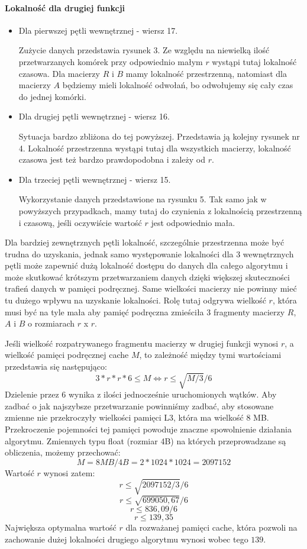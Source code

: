 \documentclass{article}
\begin{document}
\paragraph{Lokalność dla drugiej funkcji}

\begin{itemize}

\item Dla pierwszej pętli wewnętrznej - wiersz 17.

Zużycie danych przedstawia rysunek 3. Ze względu na niewielką ilość przetwarzanych komórek przy odpowiednio małym $r$ wystąpi tutaj lokalność czasowa. Dla macierzy $R$ i $B$ mamy lokalność przestrzenną, natomiast dla macierzy $A$ będziemy mieli lokalność odwołań, bo odwołujemy się cały czas do jednej komórki.

\item Dla drugiej pętli wewnętrznej - wiersz 16.

Sytuacja bardzo zbliżona do tej powyższej. Przedstawia ją kolejny rysunek nr 4. Lokalność przestrzenna wystąpi tutaj dla wszystkich macierzy, lokalność czasowa jest też bardzo prawdopodobna i zależy od $r$.

\item Dla trzeciej pętli wewnętrznej - wiersz 15.

Wykorzystanie danych przedstawione na rysunku 5. Tak samo jak w powyższych przypadkach, mamy tutaj do czynienia z lokalnością przestrzenną i czasową, jeśli oczywiście wartość $r$ jest odpowiednio mała.

\end{itemize}

Dla bardziej zewnętrznych pętli lokalność, szczególnie przestrzenna może być trudna do uzyskania, jednak samo występowanie lokalności dla 3 wewnętrznych pętli może zapewnić dużą lokalność dostępu do danych dla całego algorytmu i może skutkować krótszym przetwarzaniem danych dzięki większej skuteczności trafień danych w pamięci podręcznej. Same wielkości macierzy nie powinny mieć tu dużego wpływu na uzyskanie lokalności. Rolę tutaj odgrywa wielkość $r$, która musi być na tyle mała aby pamięć podręczna zmieściła 3 fragmenty macierzy $R$, $A$ i $B$ o rozmiarach $r$ x $r$.

Jeśli wielkość rozpatrywanego fragmentu macierzy w drugiej funkcji wynosi $r$, a wielkość pamięci podręcznej cache $M$, to zależność między tymi wartościami przedstawia się następująco:
\[ 3*r*r*6 \leq M \Longleftrightarrow r \leq \sqrt{M/3}/6\]
Dzielenie przez 6 wynika z ilości jednocześnie uruchomionych wątków. Aby zadbać o jak najszybsze przetwarzanie powinniśmy zadbać, aby stosowane zmienne nie przekroczyły wielkości pamięci L3, która ma wielkość 8 MB. Przekroczenie pojemności tej pamięci powoduje znaczne spowolnienie działania algorytmu. Zmiennych typu float (rozmiar 4B) na których przeprowadzane są obliczenia, możemy przechować: 
\[ M = 8MB/4B = 2 * 1024 * 1024 = 2097152 \]
Wartość $r$ wynosi zatem:
\[ r \leq \sqrt{2097152 / 3}/6 \]
\[ r \leq \sqrt{699050,67}/6 \]
\[ r \leq 836,09/6 \]
\[ r \leq 139,35 \]
Największa optymalna wartość $r$ dla rozważanej pamięci cache, która pozwoli na zachowanie dużej lokalności drugiego algorytmu wynosi wobec tego $139$.
\end{document}
